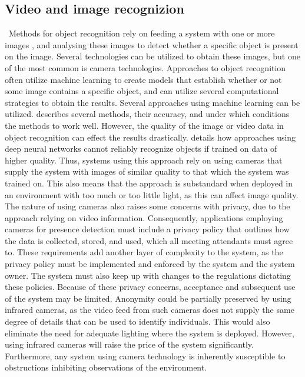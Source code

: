 \subsection{Video and image recognizion} \label{sec:video-based-detection}\
Methods for object recognition rely on feeding a system with one or more images \cite{huttenlocher1987object, computational_strategies_for_object_recog}, and analysing these images to detect whether a specific object is present on the image.
Several technologies can be utilized to obtain these images, but one of the most common is camera technologies\cite{FUERTES2022103473}. 
Approaches to object recognition often utilize machine learning to create models that establish whether or not some image contains a specific object\cite{huttenlocher1987object}, and can utilize several computational strategies to obtain the results\cite{computational_strategies_for_object_recog}. 
Several approaches using machine learning can be utilized. 
\citeauthor{object_recognision_survey} \cite{object_recognision_survey} describes several methods, their accuracy, and under which conditions the methods to work well. 
However, the quality of the image or video data in object recognition can effect the results drastically.
\citeauthor{vid_qual_affects} \cite{vid_qual_affects} details how approaches using deep neural networks cannot reliably recognize objects if trained on data of higher quality. 
Thus, systems using this approach rely on using cameras that supply the system with images of similar quality to that which the system was trained on.
This also means that the approach is substandard when deployed in an environment with too much or too little light, as this can affect image quality.  
The nature of using cameras also raises some concerns with privacy, due to the approach relying on video information. 
Consequently, applications employing cameras for presence detection must include a privacy policy that outlines how the data is collected, stored, and used, which all meeting attendants must agree to.
These requirements add another layer of complexity to the system, as the privacy policy must be implemented and enforced by the system and the system owner.
The system must also keep up with changes to the regulations dictating these policies.
Because of these privacy concerns, acceptance and subsequent use of the system may be limited\cite{granath_detecting_nodate, tang_occupancy_2020, privacyPreservingSensor}.
Anonymity could be partially preserved by using infrared cameras, as the video feed from such cameras does not supply the same degree of details that can be used to identify individuals. 
This would also eliminate the need for adequate lighting where the system is deployed.  
However, using infrared cameras will raise the price of the system significantly. 
Furthermore, any system using camera technology is inherently susceptible to obstructions inhibiting observations of the environment.
